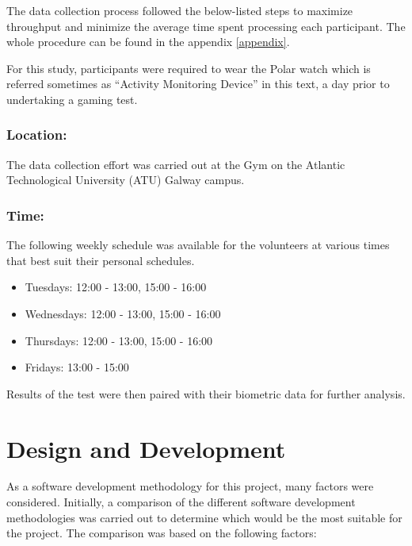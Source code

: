 The data collection process followed the below-listed steps to maximize throughput and minimize the average time spent processing each participant. The whole procedure can be found in the appendix \ref{appendix}.
\par
For this study, participants were required to wear the Polar watch which is referred sometimes as “Activity Monitoring Device” in this text, a day prior to undertaking a gaming test. 

\subsubsection*{Location:}

The data collection effort was carried out at the Gym on the Atlantic Technological University (ATU) Galway campus.

\subsubsection*{Time:}

The following weekly schedule was available for the volunteers at various times that best suit their personal schedules.
\begin{itemize}
    \item Tuesdays: 12:00 - 13:00, 15:00 - 16:00
    \item Wednesdays: 12:00 - 13:00, 15:00 - 16:00
    \item Thursdays: 12:00 - 13:00, 15:00 - 16:00
    \item Fridays: 13:00 - 15:00
\end{itemize}

Results of the test were then paired with their biometric data for further analysis.

\section{Design and Development}

As a software development methodology for this project, many factors were considered. Initially, a comparison of the different software development methodologies was carried out to determine
which would be the most suitable for the project. The comparison was based on the following factors:

